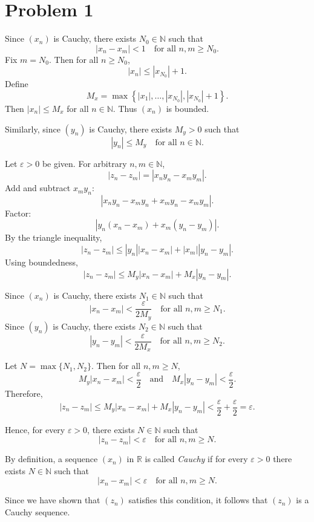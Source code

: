 \documentclass[12pt]{article}
\begin{document}
\section*{Problem 1}

Since $(x_n)$ is Cauchy, there exists $N_0 \in \mathbb{N}$ such that
\[
	|x_n - x_m| < 1
	\quad \text{for all } n,m \ge N_0.
\]
Fix $m = N_0$. Then for all $n \ge N_0$,
\[
	|x_n| \le |x_{N_0}| + 1.
\]
Define
\[
	M_x = \max\left\{ |x_1|, \dots, |x_{N_0}|, |x_{N_0}| + 1 \right\}.
\]
Then $|x_n| \le M_x$ for all $n \in \mathbb{N}$.
Thus $(x_n)$ is bounded.

Similarly, since $(y_n)$ is Cauchy, there exists $M_y > 0$ such that
\[
	|y_n| \le M_y
	\quad \text{for all } n \in \mathbb{N}.
\]

\medskip

Let $\varepsilon > 0$ be given. For arbitrary $n,m \in \mathbb{N}$,
\[
	|z_n - z_m|
	= |x_n y_n - x_m y_m|.
\]
Add and subtract $x_m y_n$:
\[
	|x_n y_n - x_m y_n + x_m y_n - x_m y_m|.
\]
Factor:
\[
	|y_n(x_n - x_m) + x_m(y_n - y_m)|.
\]
By the triangle inequality,
\[
	|z_n - z_m|
	\le |y_n||x_n - x_m| + |x_m||y_n - y_m|.
\]
Using boundedness,
\[
	|z_n - z_m|
	\le M_y |x_n - x_m| + M_x |y_n - y_m|.
\]

\medskip

Since $(x_n)$ is Cauchy, there exists $N_1 \in \mathbb{N}$ such that
\[
	|x_n - x_m| < \frac{\varepsilon}{2M_y}
	\quad \text{for all } n,m \ge N_1.
\]
Since $(y_n)$ is Cauchy, there exists $N_2 \in \mathbb{N}$ such that
\[
	|y_n - y_m| < \frac{\varepsilon}{2M_x}
	\quad \text{for all } n,m \ge N_2.
\]

Let $N = \max\{N_1, N_2\}$. Then for all $n,m \ge N$,
\[
	M_y |x_n - x_m| < \frac{\varepsilon}{2}
	\quad \text{and} \quad
	M_x |y_n - y_m| < \frac{\varepsilon}{2}.
\]
Therefore,
\[
	|z_n - z_m|
	\le M_y |x_n - x_m| + M_x |y_n - y_m|
	< \frac{\varepsilon}{2} + \frac{\varepsilon}{2}
	= \varepsilon.
\]

\medskip

Hence, for every $\varepsilon > 0$, there exists $N \in \mathbb{N}$ such that
\[
	|z_n - z_m| < \varepsilon
	\quad \text{for all } n,m \ge N.
\]

By definition, a sequence $(x_n)$ in $\mathbb{R}$ is called \emph{Cauchy} if
for every $\varepsilon > 0$ there exists $N \in \mathbb{N}$ such that
\[
	|x_n - x_m| < \varepsilon
	\quad \text{for all } n,m \ge N.
\]

Since we have shown that $(z_n)$ satisfies this condition, it follows that
$(z_n)$ is a Cauchy sequence.
\end{document}
